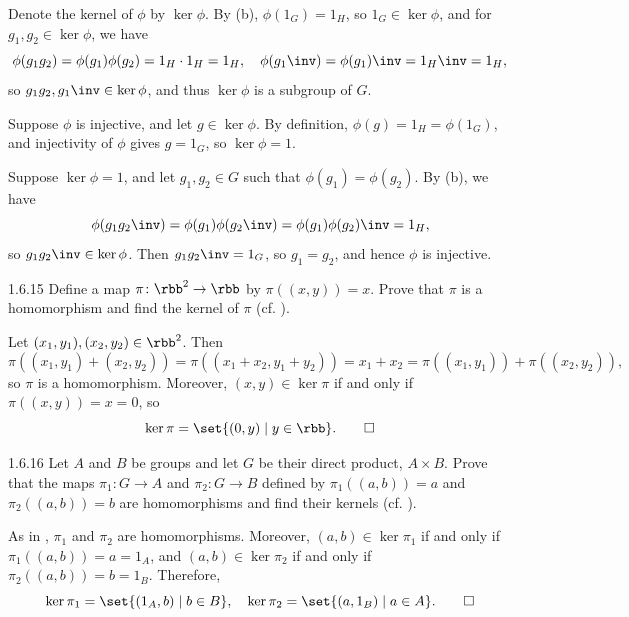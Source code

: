 \begin{sol}
    Denote the kernel of $\phi$ by $\ker\phi$.
	By (b), $\phi(1_G) = 1_H$, so $1_G \in \ker\phi$, and for $g_1, g_2 \in \ker\phi$, we have
    \[
        \phi(g_1g_2) = \phi(g_1)\phi(g_2) = 1_H \cdot 1_H = 1_H, \quad \phi(g_1\inv) = \phi(g_1)\inv = 1_H\inv = 1_H,
    \]
    so $g_1g_2, g_1\inv \in \ker\phi$, and thus $\ker\phi$ is a subgroup of $G$.

    \rightimp Suppose $\phi$ is injective, and let $g \in \ker\phi$.
    By definition, $\phi(g) = 1_H = \phi(1_G)$, and injectivity of $\phi$ gives $g = 1_G$, so $\ker\phi = 1$.

    \leftimp Suppose $\ker\phi = 1$, and let $g_1, g_2 \in G$ such that $\phi(g_1) = \phi(g_2)$.
    By (b), we have
    \[
        \phi(g_1g_2\inv) = \phi(g_1)\phi(g_2\inv) = \phi(g_1)\phi(g_2)\inv = 1_H,
    \]
    so $g_1g_2\inv \in \ker\phi$.
    Then $g_1g_2\inv = 1_G$, so $g_1 = g_2$, and hence $\phi$ is injective.
\end{sol}

\begin{exercise}{1.6.15}
    Define a map $\pi \colon \rbb^2 \to \rbb$ by $\pi((x,y)) = x$.
	Prove that $\pi$ is a homomorphism and find the kernel of $\pi$ (cf. ).
\end{exercise}

\begin{sol}
    Let $(x_1, y_1), (x_2, y_2) \in \rbb^2$.
	Then
    \[
    	\pi((x_1, y_1) + (x_2, y_2)) = \pi((x_1 + x_2, y_1 + y_2)) = x_1 + x_2 = \pi((x_1, y_1)) + \pi((x_2, y_2)),
    \]
    so $\pi$ is a homomorphism.
    Moreover, $(x, y) \in \ker\pi$ if and only if $\pi((x, y)) = x = 0$, so
    \[
        \ker\pi = \set{(0, y) \mid y \in \rbb}. \qedhere
    \]
\end{sol}

\begin{exercise}{1.6.16}
    Let $A$ and $B$ be groups and let $G$ be their direct product, $A \times B$.
	Prove that the maps $\pi_1 \colon G \to A$ and $\pi_2 \colon G \to B$ defined by $\pi_1((a,b)) = a$ and $\pi_2((a,b)) = b$ are homomorphisms and find their kernels (cf. ).
\end{exercise}

\begin{sol}
    As in , $\pi_1$ and $\pi_2$ are homomorphisms.
	Moreover, $(a, b) \in \ker\pi_1$ if and only if $\pi_1((a, b)) = a = 1_A$, and $(a, b) \in \ker\pi_2$ if and only if $\pi_2((a, b)) = b = 1_B$.
    Therefore,
    \[
        \ker\pi_1 = \set{(1_A, b) \mid b \in B}, \quad \ker\pi_2 = \set{(a, 1_B) \mid a \in A}. \qedhere
    \]
\end{sol}

